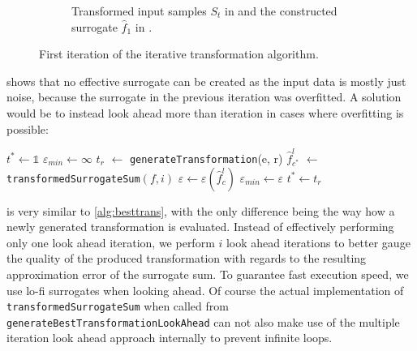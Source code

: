 \documentclass[
  a4paper,  %
  twoside,  %
  bibliography=totoc,
  headsepline,
  cleardoublepage=empty,
  parskip=half,
  draft=false
]{scrbook}
\begin{document}
\begin{mdframed}[style=style]
\begin{figure}[H]
\begin{subfigure}{.5\textwidth}
  \caption{Transformed input samples $S_t$ in \darkblue and the constructed surrogate $\hat{f}_1$ in \red.}
\label{fig:pipeline_bad_local_2}
\end{subfigure}
\delimit
\caption{First iteration of the iterative transformation algorithm.}
\label{fig:pipeline_bad_2}
\end{figure}
\end{mdframed}
%
 shows that no effective surrogate can be created as the input data is mostly just noise, because the surrogate in the previous iteration was overfitted.
A solution would be to instead look ahead more than iteration in cases where overfitting is possible:

\begin{mdframed}[style=algstyle,frametitle={\textbf{function} \texttt{generateBestTransformationLookAhead}{$(e, r_{\text{min}} ,r_{\text{max}}, i)$}}]
\normalsize
\vspace{5.5mm}
\begin{algorithmic}[1]
    \State $t^\ast \gets \mathds{1}$
    \State $\varepsilon_{min} \gets \infty$
      \State $t_r$ $\gets$ \texttt{generateTransformation}(e, r)
      \State $\hat{f}_{c^\ast}^l$ $\gets$ \texttt{transformedSurrogateSum}$(f, i)$
    	\State $\varepsilon \gets \varepsilon(\hat{f}_c^l)$
    	  \State $\varepsilon_{min}\gets \varepsilon$
    	\State $t^\ast \gets t_r$
    	\EndIf
    \EndFor
    \State {}
\end{algorithmic}
\vspace{-1.5mm}
\delimit
	\label{alg:lookahead}
\end{mdframed}
%
 is very similar to \cref{alg:besttrans}, with the only difference being the way how a newly generated transformation is evaluated.
Instead of effectively performing only one look ahead iteration, we perform $i$ look ahead iterations to better gauge the quality of the produced transformation with regards to the resulting approximation error of the surrogate sum.
To guarantee fast execution speed, we use lo-fi surrogates when looking ahead.
Of course the actual implementation of \texttt{transformedSurrogateSum} when called from \texttt{generateBestTransformationLookAhead} can not also make use of the multiple iteration look ahead approach internally to prevent infinite loops.
\end{document}
